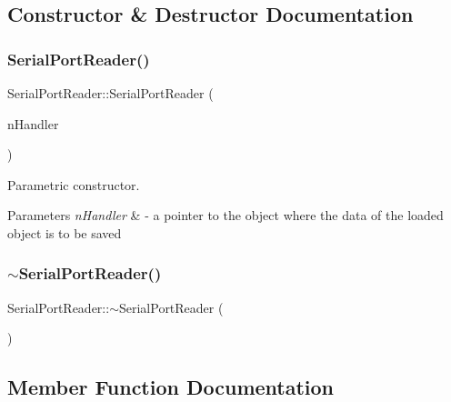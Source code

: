 \subsection{Constructor \& Destructor Documentation}
\mbox{\label{class_serial_port_reader_aef65d0e76f65204aaa57ecfc144c827d}} 
\subsubsection{\texorpdfstring{Serial\+Port\+Reader()}{SerialPortReader()}}
{\footnotesize\ttfamily Serial\+Port\+Reader\+::\+Serial\+Port\+Reader (\begin{DoxyParamCaption}\item[{\mbox{\hyperlink{class_measurement_handler}{Measurement\+Handler}} $\ast$}]{n\+Handler }\end{DoxyParamCaption})}



Parametric constructor. 


\begin{DoxyParams}{Parameters}
{\em n\+Handler} & -\/ a pointer to the object where the data of the loaded object is to be saved \\
\hline
\end{DoxyParams}
\mbox{\label{class_serial_port_reader_a7f01c445adf0d64d8acd67cd4fcd3b21}} 
\subsubsection{\texorpdfstring{$\sim$\+Serial\+Port\+Reader()}{~SerialPortReader()}}
{\footnotesize\ttfamily Serial\+Port\+Reader\+::$\sim$\+Serial\+Port\+Reader (\begin{DoxyParamCaption}{ }\end{DoxyParamCaption})}



\subsection{Member Function Documentation}
\mbox{\label{class_serial_port_reader_ad00028795b4f33ffb0a97cd76726c4fd}} 
